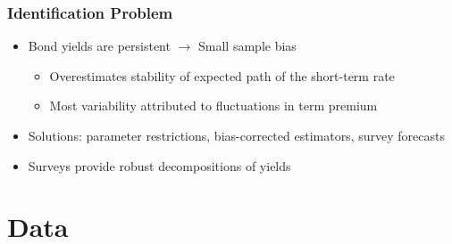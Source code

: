 \documentclass[12pt, aspectratio=169, xcolor=dvipsnames]{beamer} 			         %
\begin{document}
\begin{frame}
	\frametitle{Identification Problem}
	\begin{itemize}
		\item Bond yields are persistent $\rightarrow$ Small sample bias \citep{KimOrphanides:2012}
		\begin{itemize}
			\item Overestimates stability of expected path of the short-term rate
			\item Most variability attributed to fluctuations in term premium
		\end{itemize}
	\item Solutions: parameter restrictions, bias-corrected estimators, survey forecasts
	\item \alert{Surveys} provide robust decompositions of yields \citep{Guimaraes:2014}
	\end{itemize}
\end{frame}


\section{Data}
\end{document}
